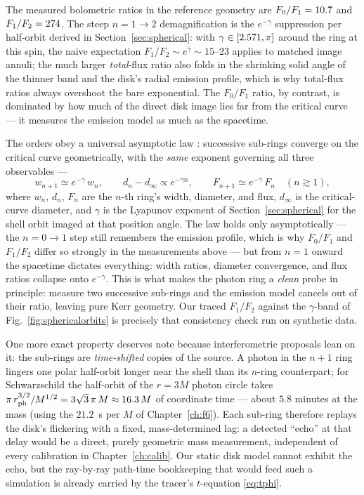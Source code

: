 The measured bolometric ratios in the reference geometry are
$F_0/F_1 = 10.7$ and $F_1/F_2 = 274$. The
steep $n = 1 \to 2$ demagnification is the $e^{-\gamma}$ suppression per
half-orbit derived in Section~\ref{sec:spherical}: with
$\gamma \in [2.571, \pi]$ around the ring at this spin, the
naive expectation $F_1/F_2 \sim e^{\bar\gamma} \sim 15$--$23$ applies to
matched image annuli; the much larger \emph{total}-flux ratio also folds
in the shrinking solid angle of the thinner band and the disk's radial
emission profile, which is why total-flux ratios always overshoot the
bare exponential. The $F_0/F_1$ ratio, by contrast, is dominated by how
much of the direct disk image lies far from the critical curve — it
measures the emission model as much as the spacetime.

The orders obey a universal asymptotic law \citep{Johnson2020,
GrallaLupsasca2020}: successive sub-rings converge on the critical
curve geometrically, with the \emph{same} exponent governing all three
observables —
\begin{equation}
w_{n+1} \simeq e^{-\gamma}\,w_n, \qquad
d_n - d_\infty \propto e^{-\gamma n}, \qquad
F_{n+1} \simeq e^{-\gamma}\,F_n \quad (n \gtrsim 1),
\label{eq:universal}
\end{equation}
where $w_n$, $d_n$, $F_n$ are the $n$-th ring's width, diameter, and
flux, $d_\infty$ is the critical-curve diameter, and $\gamma$ is the
Lyapunov exponent of Section~\ref{sec:spherical} for the shell orbit
imaged at that position angle. The law holds only asymptotically — the
$n = 0 \to 1$ step still remembers the emission profile, which is why
$F_0/F_1$ and $F_1/F_2$ differ so strongly in the measurements above —
but from $n = 1$ onward the spacetime dictates everything: width
ratios, diameter convergence, and flux ratios collapse onto
$e^{-\gamma}$. This is what makes the photon ring a \emph{clean} probe
in principle: measure two successive sub-rings and the emission model
cancels out of their ratio, leaving pure Kerr geometry. Our traced
$F_1/F_2$ against the $\gamma$-band of Fig.~\ref{fig:sphericalorbits}
is precisely that consistency check run on synthetic data.

One more exact property deserves note because interferometric
proposals lean on it: the sub-rings are \emph{time-shifted} copies of
the source. A photon in the $n{+}1$ ring lingers one polar half-orbit
longer near the shell than its $n$-ring counterpart; for Schwarzschild
the half-orbit of the $r = 3M$ photon circle takes
$\pi\,r_{\rm ph}^{3/2}/M^{1/2} = 3\sqrt{3}\,\pi\,M \approx 16.3\,M$ of
coordinate time — about $5.8$ minutes at the \sgra{} mass (using the
$21.2$~s per $M$ of Chapter~\ref{ch:f6}). Each sub-ring therefore
replays the disk's flickering with a fixed, mass-determined lag: a
detected ``echo'' at that delay would be a direct, purely geometric
mass measurement, independent of every calibration in
Chapter~\ref{ch:calib}. Our static disk model cannot exhibit the echo,
but the ray-by-ray path-time bookkeeping that would feed such a
simulation is already carried by the tracer's $t$-equation
\eqref{eq:tphi}.

